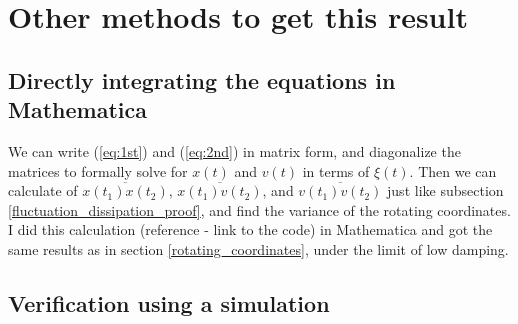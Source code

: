\documentclass[12pt, twoside]{article}
\begin{document}
\section{Other methods to get this result}
\subsection{Directly integrating the equations in Mathematica}
We can write (\ref{eq:1st}) and (\ref{eq:2nd}) in matrix form, and diagonalize the matrices to formally solve for $x(t)$ and $v(t)$ in terms of $\xi(t)$. Then we can calculate of $\overline{x(t_1)x(t_2)}$, $\overline{x(t_1)v(t_2)}$, and  $\overline{v(t_1)v(t_2)}$ just like subsection \ref{fluctuation_dissipation_proof}, and find the variance of the rotating coordinates. I did this calculation (reference - link to the code) in Mathematica and got the same results as in section \ref{rotating_coordinates}, under the limit of low damping.

\subsection{Verification using a simulation}
\end{document}
